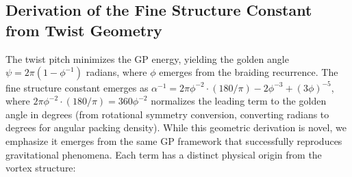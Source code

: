 \documentclass{article}
\begin{document}
\subsection{Derivation of the Fine Structure Constant from Twist Geometry}

The twist pitch minimizes the GP energy, yielding the golden angle \(\psi = 2\pi (1 - \phi^{-1})\) radians, where \(\phi\) emerges from the braiding recurrence. The fine structure constant emerges as \(\alpha^{-1} = 2\pi \phi^{-2} \cdot (180/\pi) - 2 \phi^{-3} + (3 \phi)^{-5}\), where \(2\pi \phi^{-2} \cdot (180/\pi) = 360 \phi^{-2}\) normalizes the leading term to the golden angle in degrees (from rotational symmetry conversion, converting radians to degrees for angular packing density). While this geometric derivation is novel, we emphasize it emerges from the same GP framework that successfully reproduces gravitational phenomena. Each term has a distinct physical origin from the vortex structure:
\end{document}
